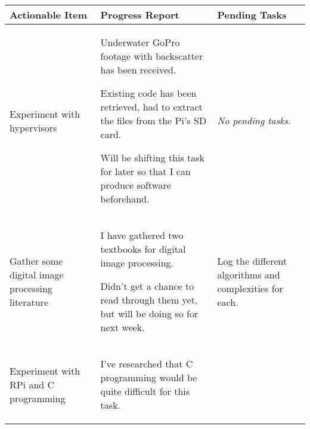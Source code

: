 \begin{table}[!h]
    \centering
    \begin{tabularx}{\textwidth}{|X|X|X|}
        \hline
        Actionable Item & Progress Report & Pending Tasks \\
        \hline
        \hline
        \begin{myitemize}
            \item Experiment with hypervisors
        \end{myitemize} & 
        \begin{myitemize}
            \item Underwater GoPro footage with backscatter has been received.
            \item Existing code has been retrieved, had to extract the files from the Pi's SD card.
            \item Will be shifting this task for later so that I can produce software beforehand.
        \end{myitemize} & 
        \begin{myitemize}
            \item \textit{No pending tasks.}
        \end{myitemize} \\
        \hline
        \begin{myitemize}
            \item Gather some digital image processing literature
        \end{myitemize} & 
        \begin{myitemize}
            \item I have gathered two textbooks for digital image processing.
            \item Didn't get a chance to read through them yet, but will be doing so for next week.
        \end{myitemize} & 
        \begin{myitemize}
            \item Log the different algorithms and complexities for each.
        \end{myitemize} \\
        \hline
        \begin{myitemize}
            \item Experiment with RPi and C programming
        \end{myitemize} & 
        \begin{myitemize}
            \item I've researched that C programming would be quite difficult for this task.

\end{myitemize}
\end{tabularx}
\end{table}
